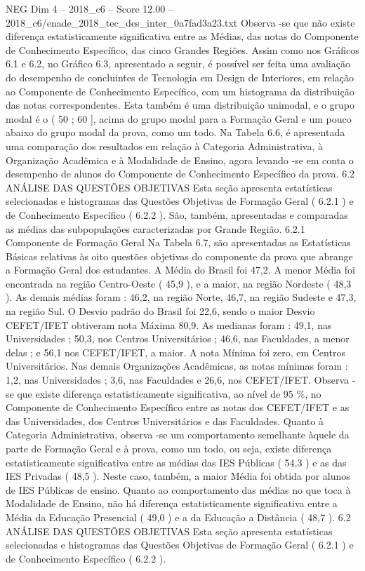 \begin{textsample}{NEG Dim 4 – 2018\_c6 – Score 12.00 – 2018\_c6/enade\_2018\_tec\_des\_inter\_0a7fad3a23.txt}
Observa -se que não existe diferença estatisticamente significativa entre as Médias, das notas do Componente de Conhecimento Específico, das cinco Grandes Regiões.
Assim como nos Gráficos 6.1 e 6.2, no Gráfico 6.3, apresentado a seguir, é possível ser feita uma avaliação do desempenho de concluintes de Tecnologia em Design de Interiores, em relação ao Componente de Conhecimento Específico, com um histograma da distribuição das notas correspondentes.
Esta também é uma distribuição unimodal, e o grupo modal é o ( 50 ; 60 ], acima do grupo modal para a Formação Geral e um pouco abaixo do grupo modal da prova, como um todo.
Na Tabela 6.6, é apresentada uma comparação dos resultados em relação à Categoria Administrativa, à Organização Acadêmica e à Modalidade de Ensino, agora levando -se em conta o desempenho de alunos do Componente de Conhecimento Específico da prova. 6.2 ANÁLISE DAS QUESTÕES OBJETIVAS Esta seção apresenta estatísticas selecionadas e histogramas das Questões Objetivas de Formação Geral ( 6.2.1 ) e de Conhecimento Específico ( 6.2.2 ).
São, também, apresentadas e comparadas as médias das subpopulações caracterizadas por Grande Região. 6.2.1 Componente de Formação Geral Na Tabela 6.7, são apresentadas as Estatísticas Básicas relativas às oito questões objetivas do componente da prova que abrange a Formação Geral dos estudantes.
A Média do Brasil foi 47,2.
A menor Média foi encontrada na região Centro-Oeste ( 45,9 ), e a maior, na região Nordeste ( 48,3 ).
As demais médias foram : 46,2, na região Norte, 46,7, na região Sudeste e 47,3, na região Sul.
O Desvio padrão do Brasil foi 22,6, sendo o maior Desvio CEFET/IFET obtiveram nota Máxima 80,9.
As medianas foram : 49,1, nas Universidades ; 50,3, nos Centros Universitários ; 46,6, nas Faculdades, a menor delas ; e 56,1 nos CEFET/IFET, a maior.
A nota Mínima foi zero, em Centros Universitários.
Nas demais Organizações Acadêmicas, as notas mínimas foram : 1,2, nas Universidades ; 3,6, nas Faculdades e 26,6, nos CEFET/IFET.
Observa -se que existe diferença estatisticamente significativa, ao nível de 95 \%, no Componente de Conhecimento Específico entre as notas dos CEFET/IFET e as das Universidades, dos Centros Universitários e das Faculdades.
Quanto à Categoria Administrativa, observa -se um comportamento semelhante àquele da parte de Formação Geral e à prova, como um todo, ou seja, existe diferença estatisticamente significativa entre as médias das IES Públicas ( 54,3 ) e as das IES Privadas ( 48,5 ).
Neste caso, também, a maior Média foi obtida por alunos de IES Públicas de ensino.
Quanto ao comportamento das médias no que toca à Modalidade de Ensino, não há diferença estatisticamente significativa entre a Média da Educação Presencial ( 49,0 ) e a da Educação a Distância ( 48,7 ). 6.2 ANÁLISE DAS QUESTÕES OBJETIVAS Esta seção apresenta estatísticas selecionadas e histogramas das Questões Objetivas de Formação Geral ( 6.2.1 ) e de Conhecimento Específico ( 6.2.2 ).

\end{textsample}

